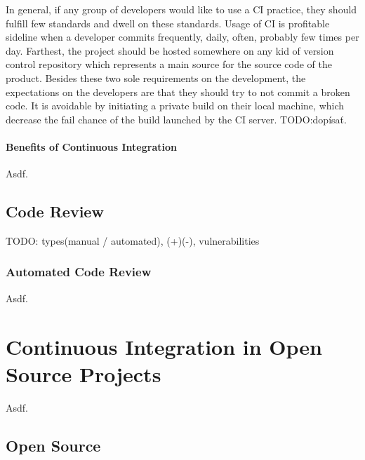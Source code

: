 In general, if any group of developers would like to use a CI practice, they should fulfill few standards and dwell on these standards. Usage of CI is profitable sideline when a developer commits frequently, daily, often, probably few times per day. Farthest, the project should be hosted somewhere on any kid of version control repository which represents a main source for the source code of the product. Besides these two sole requirements on the development, the expectations on the developers are that they should try to not commit a broken code. It is avoidable by initiating a private build on their local machine, which decrease the fail chance of the build launched by the CI server. {\color{red}TODO:dopísať}.

\subsubsection{Benefits of Continuous Integration}

Asdf.


\section{Code Review}

{\color{red}TODO: types(manual / automated), (+)(-), vulnerabilities}

\subsection{Automated Code Review}

Asdf.

\chapter{Continuous Integration in Open Source Projects}

Asdf.

\section{Open Source}

